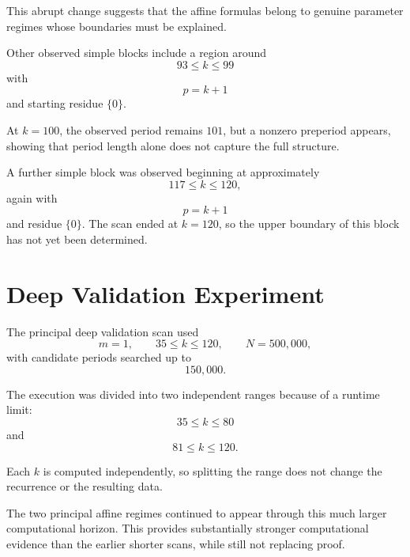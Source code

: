 \documentclass[11pt]{article}
\begin{document}
This abrupt change suggests that the affine formulas belong to genuine parameter regimes whose boundaries must be explained.

Other observed simple blocks include a region around
\begin{equation}
    93\le k\le99
\end{equation}
with
\begin{equation}
    p=k+1
\end{equation}
and starting residue $\{0\}$.

At $k=100$, the observed period remains $101$, but a nonzero preperiod appears, showing that period length alone does not capture the full structure.

A further simple block was observed beginning at approximately
\begin{equation}
    117\le k\le120,
\end{equation}
again with
\begin{equation}
    p=k+1
\end{equation}
and residue $\{0\}$. The scan ended at $k=120$, so the upper boundary of this block has not yet been determined.

\section{Deep Validation Experiment}

The principal deep validation scan used
\begin{equation}
    m=1,
    \qquad
    35\le k\le120,
    \qquad
    N=500{,}000,
\end{equation}
with candidate periods searched up to
\begin{equation}
    150{,}000.
\end{equation}

The execution was divided into two independent ranges because of a runtime limit:
\begin{equation}
    35\le k\le80
\end{equation}
and
\begin{equation}
    81\le k\le120.
\end{equation}

Each $k$ is computed independently, so splitting the range does not change the recurrence or the resulting data.

The two principal affine regimes continued to appear through this much larger computational horizon. This provides substantially stronger computational evidence than the earlier shorter scans, while still not replacing proof.
\end{document}
